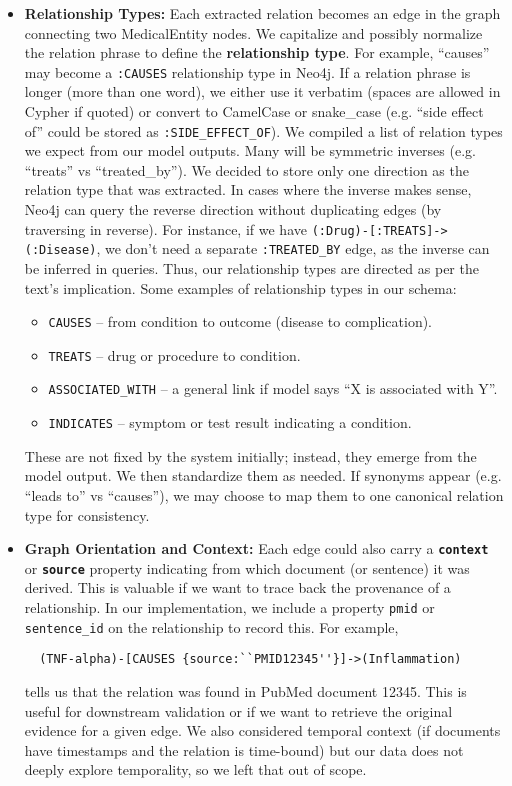 \begin{itemize}
\item \textbf{Relationship Types:} Each extracted relation becomes an edge in the graph connecting two MedicalEntity nodes. We capitalize and possibly normalize the relation phrase to define the \textbf{relationship type}. For example, ``causes'' may become a \texttt{:CAUSES} relationship type in Neo4j. If a relation phrase is longer (more than one word), we either use it verbatim (spaces are allowed in Cypher if quoted) or convert to CamelCase or snake\_case (e.g. ``side effect of'' could be stored as \texttt{:SIDE\_EFFECT\_OF}). We compiled a list of relation types we expect from our model outputs. Many will be symmetric inverses (e.g. ``treats'' vs ``treated\_by''). We decided to store only one direction as the relation type that was extracted. In cases where the inverse makes sense, Neo4j can query the reverse direction without duplicating edges (by traversing in reverse). For instance, if we have \texttt{(:Drug)-[:TREATS]->(:Disease)}, we don't need a separate \texttt{:TREATED\_BY} edge, as the inverse can be inferred in queries. Thus, our relationship types are directed as per the text's implication. Some examples of relationship types in our schema:

  \begin{itemize}
  \item \texttt{CAUSES} – from condition to outcome (disease to complication).
  \item \texttt{TREATS} – drug or procedure to condition.
  \item \texttt{ASSOCIATED\_WITH} – a general link if model says ``X is associated with Y''.
  \item \texttt{INDICATES} – symptom or test result indicating a condition.
  \end{itemize}
  
  These are not fixed by the system initially; instead, they emerge from the model output. We then standardize them as needed. If synonyms appear (e.g. ``leads to'' vs ``causes''), we may choose to map them to one canonical relation type for consistency.

\item \textbf{Graph Orientation and Context:} Each edge could also carry a \textbf{\texttt{context}} or \textbf{\texttt{source}} property indicating from which document (or sentence) it was derived. This is valuable if we want to trace back the provenance of a relationship. In our implementation, we include a property \texttt{pmid} or \texttt{sentence\_id} on the relationship to record this. For example,
 \begin{verbatim}
  (TNF-alpha)-[CAUSES {source:``PMID12345''}]->(Inflammation)
\end{verbatim}
 tells us that the relation was found in PubMed document 12345. This is useful for downstream validation or if we want to retrieve the original evidence for a given edge. We also considered temporal context (if documents have timestamps and the relation is time-bound) but our data does not deeply explore temporality, so we left that out of scope.
\end{itemize}

